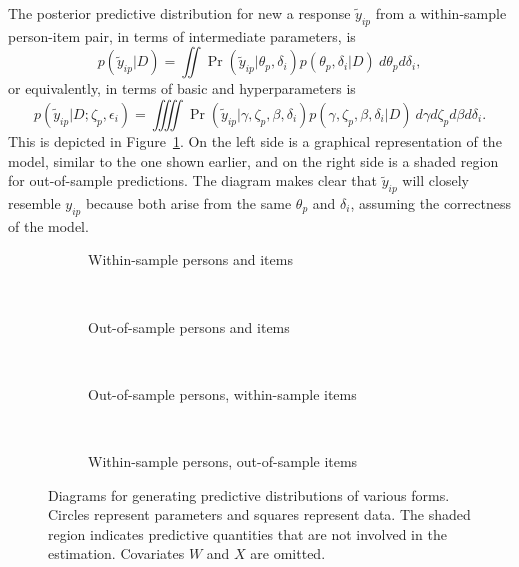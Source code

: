 \documentclass[12pt, letterpaper]{article}
\begin{document}
The posterior predictive distribution \parencite{rubin1984bayesianly} for new a response $\tilde y_{ip}$ from a within-sample person-item pair, in terms of intermediate parameters, is
\begin{equation}
	p(\tilde y_{ip} | D) =
	\iint
		\Pr (\tilde y_{ip} | \theta_p, \delta_i)
		p(\theta_p, \delta_i | D)
	~d\theta_p d\delta_i
,\end{equation}
or equivalently, in terms of basic and hyperparameters is
\begin{equation} \label{eq:yrep-post}
	p(\tilde y_{ip} | D;  \zeta_p, \epsilon_i) =
	\iiiint
		\Pr (\tilde y_{ip} | \gamma, \zeta_p, \beta, \delta_i)
		p(\gamma, \zeta_p, \beta, \delta_i | D)
	~d\gamma d\zeta_p d\beta d\delta_i
.\end{equation}
This is depicted in Figure~\ref{subfig:ppmc-same-both}. On the left side is a graphical representation of the model, similar to the one shown earlier, and on the right side is a shaded region for out-of-sample predictions. The diagram makes clear that $\tilde y_{ip}$ will closely resemble $y_{ip}$ because both arise from the same $\theta_p$ and $\delta_i$, assuming the correctness of the model.

\begin{figure}[btp]
	\centering
	\begin{subfigure}[b]{.4\textwidth}
		
		\caption{Within-sample persons and items}
		\label{subfig:ppmc-same-both}
	\end{subfigure}
	~
	\begin{subfigure}[b]{.4\textwidth}
		
		\caption{Out-of-sample persons and items}
		\label{subfig:ppmc-new-both}
	\end{subfigure}
	~
	\begin{subfigure}[b]{.4\textwidth}
		
		\caption{Out-of-sample persons, within-sample items}
		\label{subfig:ppmc-new-persons}
	\end{subfigure}
	~
	\begin{subfigure}[b]{.4\textwidth}
		
		\caption{Within-sample persons, out-of-sample items}
		\label{subfig:ppmc-new-items}
	\end{subfigure}
	\caption{Diagrams for generating predictive distributions of various forms. Circles represent parameters and squares represent data. The shaded region indicates predictive quantities that are not involved in the estimation. Covariates $W$ and $X$ are omitted.}
	\label{fig:ppmc-models}
\end{figure}
\end{document}
